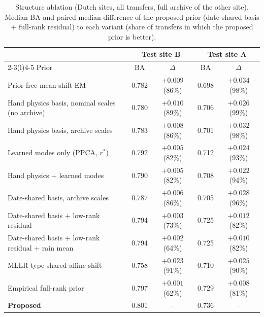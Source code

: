 \begin{table}[!t]
\caption{Structure ablation (Dutch sites, all transfers, full archive of the other site). Median BA and paired median difference of the proposed prior (date-shared basis + full-rank residual) to each variant (share of transfers in which the proposed prior is better).}
\label{tab:s_ablation}
\centering\footnotesize
\begin{tabular}{@{}lcccc@{}}
\toprule
 & \multicolumn{2}{c}{Test site B} & \multicolumn{2}{c}{Test site A}\\
\cmidrule(lr){2-3}\cmidrule(l){4-5}
Prior & BA & $\Delta$ & BA & $\Delta$\\
\midrule
Prior-free mean-shift EM & 0.782 & $+0.009$ (86\%) & 0.698 & $+0.034$ (98\%)\\
Hand physics basis, nominal scales (no archive) & 0.780 & $+0.010$ (89\%) & 0.706 & $+0.026$ (99\%)\\
Hand physics basis, archive scales & 0.783 & $+0.008$ (86\%) & 0.701 & $+0.032$ (98\%)\\
Learned modes only (PPCA, $r^*$) & 0.792 & $+0.005$ (82\%) & 0.712 & $+0.024$ (93\%)\\
Hand physics + learned modes & 0.790 & $+0.005$ (82\%) & 0.708 & $+0.022$ (94\%)\\
Date-shared basis, archive scales & 0.787 & $+0.006$ (86\%) & 0.705 & $+0.028$ (96\%)\\
Date-shared basis + low-rank residual & 0.794 & $+0.003$ (73\%) & 0.725 & $+0.012$ (82\%)\\
Date-shared basis + low-rank residual + rain mean & 0.794 & $+0.002$ (64\%) & 0.725 & $+0.010$ (82\%)\\
MLLR-type shared affine shift & 0.758 & $+0.023$ (91\%) & 0.710 & $+0.025$ (90\%)\\
Empirical full-rank prior & 0.797 & $+0.001$ (62\%) & 0.729 & $+0.008$ (81\%)\\
\midrule
\textbf{Proposed} & 0.801 & -- & 0.736 & --\\
\bottomrule
\end{tabular}
\end{table}